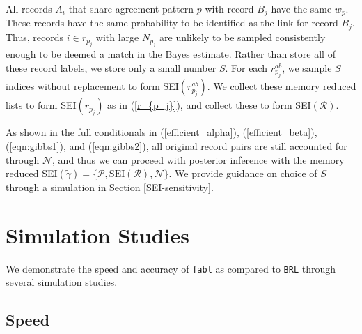 \documentclass[ba]{imsart}
\begin{document}
All records $A_i$ that share agreement pattern $p$ with record $B_j$ have the same $w_{p}$. These records have the same probability to be identified as the link for record $B_j$. Thus, records $i \in r_{p_j}$ with large $N_{p_j}$ are unlikely to be sampled consistently enough to be deemed a match in the Bayes estimate. Rather than store all of these record labels, we store only a small number $S$. For each $r_{p_j}^{ab}$, we sample $S$ indices without replacement to form SEI$(r_{p_j}^{ab})$. We collect these memory reduced lists to form SEI$(r_{p_j})$ as in (\ref{r_{p_j}}), and collect these to form SEI$(\mathcal{R})$. 

As shown in the full conditionals in (\ref{efficient_alpha}),  (\ref{efficient_beta}), (\ref{eqn:gibbs1}), and (\ref{eqn:gibbs2}), all original record pairs are still accounted for through $\mathcal{N}$, and thus we can proceed with posterior inference with the memory reduced SEI$(\tilde{\gamma}) = \{\mathcal{P}, \text{SEI}(\mathcal{R}), \mathcal{N}\}$. We provide guidance on choice of $S$ through a simulation in Section \ref{SEI-sensitivity}.

	\section{Simulation Studies}
	\label{sec:simulations}
	
	We demonstrate the speed and accuracy of \texttt{fabl} as compared to \texttt{BRL} through several simulation studies. 
	
	\hypertarget{speed}{%
		\subsection{Speed}\label{speed}}
	
\end{document}
